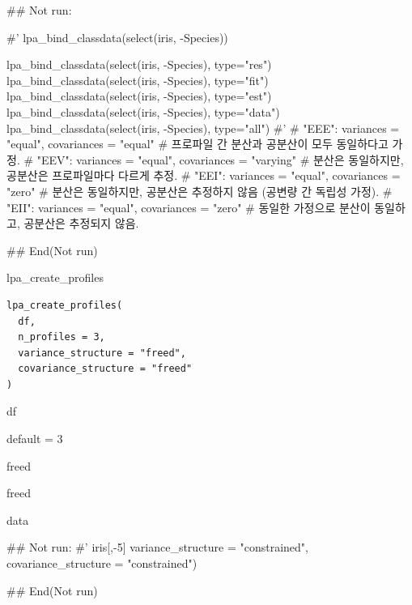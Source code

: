 \documentclass[a4paper]{book}
\begin{document}
\begin{Examples}
\begin{ExampleCode}

\#\# Not run: 

#'
lpa_bind_classdata(select(iris, -Species))

lpa_bind_classdata(select(iris, -Species), type="res")
lpa_bind_classdata(select(iris, -Species), type="fit")
lpa_bind_classdata(select(iris, -Species), type="est")
lpa_bind_classdata(select(iris, -Species), type="data")%
lpa_bind_classdata(select(iris, -Species), type="all")
#'
# "EEE": variances = "equal", covariances = "equal"
# 프로파일 간 분산과 공분산이 모두 동일하다고 가정.
# "EEV": variances = "equal", covariances = "varying"
# 분산은 동일하지만, 공분산은 프로파일마다 다르게 추정.
# "EEI": variances = "equal", covariances = "zero"
# 분산은 동일하지만, 공분산은 추정하지 않음 (공변량 간 독립성 가정).
# "EII": variances = "equal", covariances = "zero"
# 동일한 가정으로 분산이 동일하고, 공분산은 추정되지 않음.

## End(Not run)



\end{ExampleCode}
\end{Examples}

%
\begin{Description}
lpa\_create\_profiles
\end{Description}
%
\begin{Usage}
\begin{verbatim}
lpa_create_profiles(
  df,
  n_profiles = 3,
  variance_structure = "freed",
  covariance_structure = "freed"
)
\end{verbatim}
\end{Usage}
%
\begin{Arguments}
\begin{ldescription}
\item[\code{df}] df

\item[\code{n\_profiles}] default = 3

\item[\code{variance\_structure}] freed

\item[\code{covariance\_structure}] freed
\end{ldescription}
\end{Arguments}
%
\begin{Value}
data
\end{Value}
%
\begin{Examples}
\begin{ExampleCode}

\#\# Not run: 
#'
iris[,-5]%
                                    variance_structure = "constrained",
                                    covariance_structure = "constrained")

## End(Not run)


\end{ExampleCode}
\end{Examples}
\end{document}
